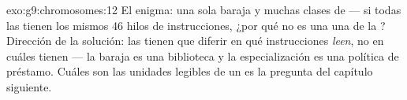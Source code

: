 \begin{solution}{exo:g9:chromosomes:12}
El enigma: una sola baraja y muchas clases de  --- si todas las
 tienen los mismos 46 hilos de instrucciones, ¿por qué no es una
 una  de la ? Dirección de la solución: las 
tienen que diferir en qué instrucciones \emph{leen}, no en cuáles
tienen --- la baraja es una biblioteca y la especialización es una
política de préstamo. Cuáles son las unidades legibles de un 
es la pregunta del capítulo siguiente.
\end{solution}

